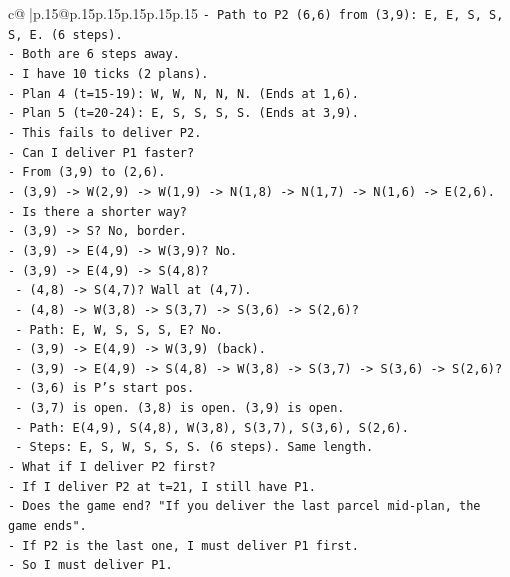 \documentclass{article}
\begin{document}
{\begin{supertabular}{c@{$\;$}|p{.15\linewidth}@{}p{.15\linewidth}p{.15\linewidth}p{.15\linewidth}p{.15\linewidth}p{.15\linewidth}}
{{{\texttt{{-} Path to P2 (6,6) from (3,9): E, E, S, S, S, E. (6 steps).} \\
\texttt{{-} Both are 6 steps away.} \\
\texttt{{-} I have 10 ticks (2 plans).} \\
\texttt{{-} Plan 4 (t=15{-}19): W, W, N, N, N. (Ends at 1,6).} \\
\texttt{{-} Plan 5 (t=20{-}24): E, S, S, S, S. (Ends at 3,9).} \\
\texttt{{-} This fails to deliver P2.} \\
\texttt{{-} Can I deliver P1 faster?} \\
\texttt{{-} From (3,9) to (2,6).} \\
\texttt{{-} (3,9) {-}> W(2,9) {-}> W(1,9) {-}> N(1,8) {-}> N(1,7) {-}> N(1,6) {-}> E(2,6).} \\
\texttt{{-} Is there a shorter way?} \\
\texttt{{-} (3,9) {-}> S? No, border.} \\
\texttt{{-} (3,9) {-}> E(4,9) {-}> W(3,9)? No.} \\
\texttt{{-} (3,9) {-}> E(4,9) {-}> S(4,8)?} \\
\texttt{  {-} (4,8) {-}> S(4,7)? Wall at (4,7).} \\
\texttt{  {-} (4,8) {-}> W(3,8) {-}> S(3,7) {-}> S(3,6) {-}> S(2,6)?} \\
\texttt{  {-} Path: E, W, S, S, S, E? No.} \\
\texttt{  {-} (3,9) {-}> E(4,9) {-}> W(3,9) (back).} \\
\texttt{  {-} (3,9) {-}> E(4,9) {-}> S(4,8) {-}> W(3,8) {-}> S(3,7) {-}> S(3,6) {-}> S(2,6)?} \\
\texttt{    {-} (3,6) is P's start pos.} \\
\texttt{    {-} (3,7) is open. (3,8) is open. (3,9) is open.} \\
\texttt{    {-} Path: E(4,9), S(4,8), W(3,8), S(3,7), S(3,6), S(2,6).} \\
\texttt{    {-} Steps: E, S, W, S, S, S. (6 steps). Same length.} \\
\texttt{{-} What if I deliver P2 first?} \\
\texttt{{-} If I deliver P2 at t=21, I still have P1.} \\
\texttt{{-} Does the game end? "If you deliver the last parcel mid{-}plan, the game ends".} \\
\texttt{{-} If P2 is the last one, I must deliver P1 first.} \\
\texttt{{-} So I must deliver P1.} \\
}}}
\end{supertabular}}
\end{document}
